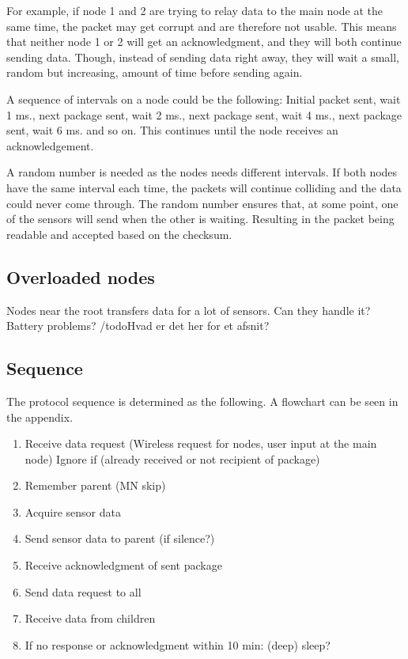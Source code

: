 For example, if node 1 and 2 are trying to relay data to the main node at the same time, the packet may get corrupt and are therefore not usable. This means that neither node 1 or 2 will get an acknowledgment, and they will both continue sending data. Though, instead of sending data right away, they will wait a small, random but increasing, amount of time before sending again.

A sequence of intervals on a node could be the following: Initial packet sent, wait 1 ms., next package sent, wait 2 ms.,  next package sent, wait 4 ms., next package sent, wait 6 ms. and so on. This continues until the node receives an acknowledgement.

A random number is needed as the nodes needs different intervals. If both nodes have the same interval each time, the packets will continue colliding and the data could never come through. The random number ensures that, at some point, one of the sensors will send when the other is waiting. Resulting in the packet being readable and accepted based on the checksum.

\subsection{Overloaded nodes}
Nodes near the root transfers data for a lot of sensors. Can they handle it? Battery problems? /todo{Hvad er det her for et afsnit?}

\subsection{Sequence}
The protocol sequence is determined as the following. A flowchart can be seen in the appendix.
\begin{enumerate}
	\item Receive data request (Wireless request for nodes, user input at the main node)
		\subitem Ignore if (already received or not recipient of package)
	\item Remember parent (MN skip)
	\item Acquire sensor data
	\item Send sensor data to parent (if silence?)
	\item Receive acknowledgment of sent package
	\item Send data request to all
	\item Receive data from children
	\item If no response or acknowledgment within 10 min: (deep) sleep?
\end{enumerate}

